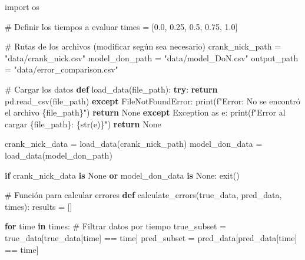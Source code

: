 \documentclass[
  spanish,
  us-letterpaper,
  DIV=11,
  numbers=noendperiod]{scrreprt}
\newenvironment{Shaded}{\begin{snugshade}}{\end{snugshade}}
\newcommand{\BuiltInTok}[1]{\textcolor[rgb]{0.00,0.23,0.31}{#1}}
\newcommand{\CommentTok}[1]{\textcolor[rgb]{0.37,0.37,0.37}{#1}}
\newcommand{\ControlFlowTok}[1]{\textcolor[rgb]{0.00,0.23,0.31}{\textbf{#1}}}
\newcommand{\FloatTok}[1]{\textcolor[rgb]{0.68,0.00,0.00}{#1}}
\newcommand{\ImportTok}[1]{\textcolor[rgb]{0.00,0.46,0.62}{#1}}
\newcommand{\KeywordTok}[1]{\textcolor[rgb]{0.00,0.23,0.31}{\textbf{#1}}}
\newcommand{\NormalTok}[1]{\textcolor[rgb]{0.00,0.23,0.31}{#1}}
\newcommand{\OperatorTok}[1]{\textcolor[rgb]{0.37,0.37,0.37}{#1}}
\newcommand{\PreprocessorTok}[1]{\textcolor[rgb]{0.68,0.00,0.00}{#1}}
\newcommand{\SpecialCharTok}[1]{\textcolor[rgb]{0.37,0.37,0.37}{#1}}
\newcommand{\SpecialStringTok}[1]{\textcolor[rgb]{0.13,0.47,0.30}{#1}}
\newcommand{\StringTok}[1]{\textcolor[rgb]{0.13,0.47,0.30}{#1}}
\newcommand{\VariableTok}[1]{\textcolor[rgb]{0.07,0.07,0.07}{#1}}
\theoremstyle{definition}
\theoremstyle{plain}
\theoremstyle{remark}
\begin{document}
\begin{Shaded}
\begin{Highlighting}[]
\ImportTok{import}\NormalTok{ os}

\CommentTok{\# Definir los tiempos a evaluar}
\NormalTok{times }\OperatorTok{=}\NormalTok{ [}\FloatTok{0.0}\NormalTok{, }\FloatTok{0.25}\NormalTok{, }\FloatTok{0.5}\NormalTok{, }\FloatTok{0.75}\NormalTok{, }\FloatTok{1.0}\NormalTok{]}

\CommentTok{\# Rutas de los archivos (modificar según sea necesario)}
\NormalTok{crank\_nick\_path }\OperatorTok{=} \StringTok{"data/crank\_nick.csv"}
\NormalTok{model\_don\_path }\OperatorTok{=} \StringTok{"data/model\_DoN.csv"}
\NormalTok{output\_path }\OperatorTok{=} \StringTok{"data/error\_comparison.csv"}

\CommentTok{\# Cargar los datos}
\KeywordTok{def}\NormalTok{ load\_data(file\_path):}
    \ControlFlowTok{try}\NormalTok{:}
        \ControlFlowTok{return}\NormalTok{ pd.read\_csv(file\_path)}
    \ControlFlowTok{except} \PreprocessorTok{FileNotFoundError}\NormalTok{:}
        \BuiltInTok{print}\NormalTok{(}\SpecialStringTok{f"Error: No se encontró el archivo }\SpecialCharTok{\{}\NormalTok{file\_path}\SpecialCharTok{\}}\SpecialStringTok{"}\NormalTok{)}
        \ControlFlowTok{return} \VariableTok{None}
    \ControlFlowTok{except} \PreprocessorTok{Exception} \ImportTok{as}\NormalTok{ e:}
        \BuiltInTok{print}\NormalTok{(}\SpecialStringTok{f"Error al cargar }\SpecialCharTok{\{}\NormalTok{file\_path}\SpecialCharTok{\}}\SpecialStringTok{: }\SpecialCharTok{\{}\BuiltInTok{str}\NormalTok{(e)}\SpecialCharTok{\}}\SpecialStringTok{"}\NormalTok{)}
        \ControlFlowTok{return} \VariableTok{None}

\NormalTok{crank\_nick\_data }\OperatorTok{=}\NormalTok{ load\_data(crank\_nick\_path)}
\NormalTok{model\_don\_data }\OperatorTok{=}\NormalTok{ load\_data(model\_don\_path)}

\ControlFlowTok{if}\NormalTok{ crank\_nick\_data }\KeywordTok{is} \VariableTok{None} \KeywordTok{or}\NormalTok{ model\_don\_data }\KeywordTok{is} \VariableTok{None}\NormalTok{:}
\NormalTok{    exit()}

\CommentTok{\# Función para calcular errores}
\KeywordTok{def}\NormalTok{ calculate\_errors(true\_data, pred\_data, times):}
\NormalTok{    results }\OperatorTok{=}\NormalTok{ []}
    
    \ControlFlowTok{for}\NormalTok{ time }\KeywordTok{in}\NormalTok{ times:}
        \CommentTok{\# Filtrar datos por tiempo}
\NormalTok{        true\_subset }\OperatorTok{=}\NormalTok{ true\_data[true\_data[}\StringTok{\textquotesingle{}time\textquotesingle{}}\NormalTok{] }\OperatorTok{==}\NormalTok{ time]}
\NormalTok{        pred\_subset }\OperatorTok{=}\NormalTok{ pred\_data[pred\_data[}\StringTok{\textquotesingle{}time\textquotesingle{}}\NormalTok{] }\OperatorTok{==}\NormalTok{ time]}
        

\end{Highlighting}
\end{Shaded}
\end{document}
